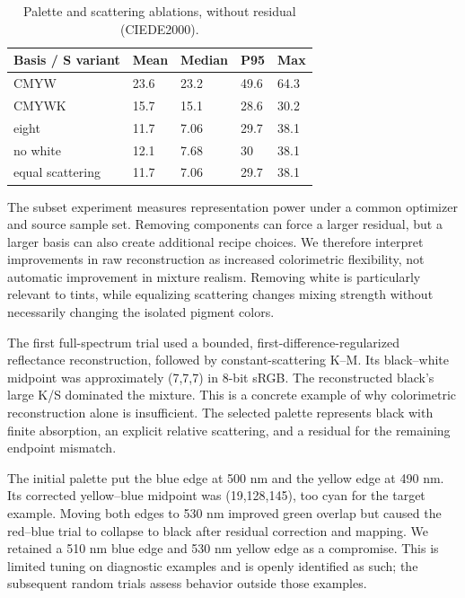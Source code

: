 \documentclass[
  10pt,
  twocolumn]{article}
\begin{document}
\begin{table}[t]
\caption{Palette and scattering ablations, without residual (CIEDE2000).}
\centering\small
\begin{tabular}{@{}lllll@{}}
\toprule\noalign{}
Basis / S variant & Mean & Median & P95 & Max \\
\midrule\noalign{}

\bottomrule\noalign{}

CMYW & 23.6 & 23.2 & 49.6 & 64.3 \\
CMYWK & 15.7 & 15.1 & 28.6 & 30.2 \\
eight & 11.7 & 7.06 & 29.7 & 38.1 \\
no white & 12.1 & 7.68 & 30 & 38.1 \\
equal scattering & 11.7 & 7.06 & 29.7 & 38.1 \\
\end{tabular}
\end{table}

The subset experiment measures representation power under a common
optimizer and source sample set. Removing components can force a larger
residual, but a larger basis can also create additional recipe choices.
We therefore interpret improvements in raw reconstruction as increased
colorimetric flexibility, not automatic improvement in mixture realism.
Removing white is particularly relevant to tints, while equalizing
scattering changes mixing strength without necessarily changing the
isolated pigment colors.

The first full-spectrum trial used a bounded,
first-difference-regularized reflectance reconstruction, followed by
constant-scattering K--M. Its black--white midpoint was approximately
(7,7,7) in 8-bit sRGB. The reconstructed black's large K/S dominated the
mixture. This is a concrete example of why colorimetric reconstruction
alone is insufficient. The selected palette represents black with finite
absorption, an explicit relative scattering, and a residual for the
remaining endpoint mismatch.

The initial palette put the blue edge at 500 nm and the yellow edge at
490 nm. Its corrected yellow--blue midpoint was (19,128,145), too cyan
for the target example. Moving both edges to 530 nm improved green
overlap but caused the red--blue trial to collapse to black after
residual correction and mapping. We retained a 510 nm blue edge and 530
nm yellow edge as a compromise. This is limited tuning on diagnostic
examples and is openly identified as such; the subsequent random trials
assess behavior outside those examples.
\end{document}
